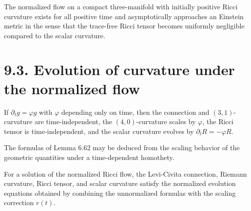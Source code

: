 \begin{corollary}
\label{ch06-cor-asymptotic-einstein}

The normalized flow on a compact three-manifold with initially positive Ricci curvature exists for all positive time and asymptotically approaches an Einstein metric in the sense that the trace-free Ricci tensor becomes uniformly negligible compared to the scalar curvature.
\end{corollary}

\section*{9.3. Evolution of curvature under the normalized flow}

\begin{lemma}
\label{ch06-lem-pure-scaling-evolution}

If \(\partial_t g=\varphi g\) with \(\varphi\) depending only on time, then the connection and \((3,1)\)-curvature are time-independent, the \((4,0)\)-curvature scales by \(\varphi\), the Ricci tensor is time-independent, and the scalar curvature evolves by \(\partial_t R=-\varphi R\).
\end{lemma}

\begin{remark}
\label{ch06-rem-scaling-interpretation}

The formulas of Lemma 6.62 may be deduced from the scaling behavior of the geometric quantities under a time-dependent homothety.
\end{remark}

\begin{corollary}
\label{ch06-cor-curvature-evolution-normalized-flow}

For a solution of the normalized Ricci flow, the Levi-Civita connection, Riemann curvature, Ricci tensor, and scalar curvature satisfy the normalized evolution equations obtained by combining the unnormalized formulas with the scaling correction \(r(t)\).
\end{corollary}

